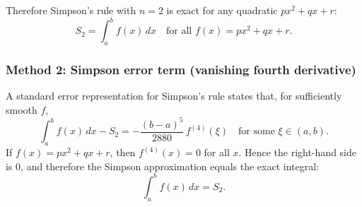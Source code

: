 \documentclass[12pt]{article}
\begin{document}
Therefore Simpson's rule with \(n=2\) is exact for any quadratic \(px^{2}+qx+r\):
\[
\boxed{S_2=\int_a^b f(x)\,dx \quad \text{for all } f(x)=px^{2}+qx+r.}
\]

\subsubsection*{Method 2: Simpson error term (vanishing fourth derivative)}

A standard error representation for Simpson's rule states that, for sufficiently smooth \(f\),
\[
\int_{a}^{b} f(x)\,dx - S_2
= -\frac{(b-a)^{5}}{2880}\,f^{(4)}(\xi)
\quad\text{for some }\xi\in(a,b).
\]
If \(f(x)=px^{2}+qx+r\), then \(f^{(4)}(x)=0\) for all \(x\). Hence the right-hand side is \(0\), and therefore the Simpson approximation equals the exact integral:
\[
\boxed{\int_{a}^{b}f(x)\,dx=S_2.}
\]
\end{document}
